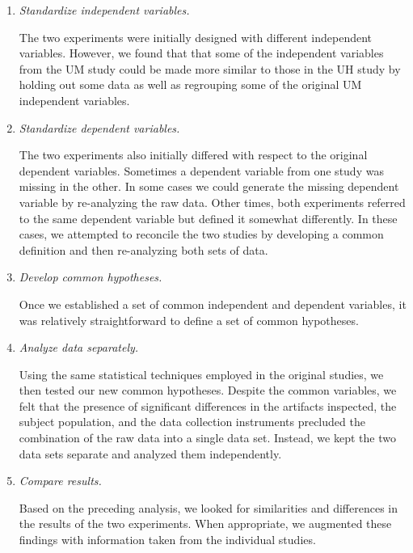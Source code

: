 \begin{enumerate}
  
\item {\em Standardize independent variables.} 
  
  The two experiments were initially designed with different independent
  variables. However, we found that that some of the independent
  variables from the UM study could be made more similar to those in the 
  UH study by holding out some data as well as regrouping some of the original 
  UM independent variables.
  
\item {\em Standardize dependent variables.}

  The two experiments also initially differed with respect to the original 
  dependent variables. Sometimes a dependent variable from one study 
  was missing in the other. In some cases we could generate the missing 
  dependent variable by re-analyzing the raw data. Other times, both 
  experiments referred to the same dependent variable but defined it 
  somewhat differently. In these cases, we attempted to reconcile the 
  two studies by developing a common definition and then re-analyzing 
  both sets of data. 

\item {\em Develop common hypotheses.}
  
  Once we established a set of common independent and dependent variables,
  it was relatively straightforward to define a set of common hypotheses.

\item {\em Analyze data separately.}
  
  Using the same statistical techniques employed in the original
  studies, we then tested our new common hypotheses. Despite the common
  variables, we felt that the presence of significant differences in the
  artifacts inspected, the subject population, and the data collection
  instruments precluded the combination of the raw data into a single data
  set. Instead, we kept the two data sets separate and analyzed them
  independently.

\item {\em Compare results.}
  
  Based on the preceding analysis, we looked for similarities and
  differences in the results of the two experiments. When appropriate, we
  augmented these findings with information taken from the individual studies.
        
\end{enumerate}

